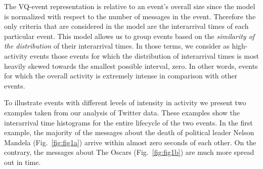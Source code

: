 \documentclass[10pt,letterpaper]{article}
\begin{document}
The VQ-event representation is relative to an event's overall size
since the model is normalized with respect to the number of messages in the
event. Therefore the only criteria that are considered in the model are the
interarrival times of each particular event. This model allows us to group events based on the
{\em similarity of the distribution} of their interarrival times.
In those terms, we consider as high-activity events those events for which
the distribution of interarrival times is most heavily
skewed towards the smallest possible interval, zero.  In other words,
events for which the overall activity is extremely intense in comparison
with other events.

To illustrate events with different levels of intensity in activity we
present two examples taken from our analysis of Twitter data. These
examples show the interarrival time histograms for the entire lifecycle of
the two events. In
the first example, the majority of the messages about
the death of political leader Nelson Mandela
(Fig.~\ref{fig:fig1a}) arrive within almost zero seconds of
each other. On the contrary, the messages about The Oscars
(Fig.~\ref{fig:fig1b}) are much more spread out in time.
\end{document}
